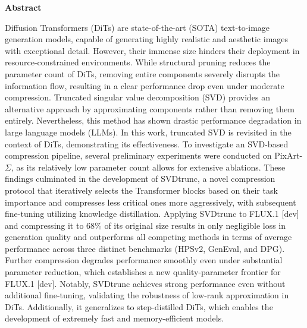 \thispagestyle{plain}
\setcounter{page}{3}
\begin{center}
    \textbf{Abstract}\\
\end{center}
    Diffusion Transformers (\gls{DiT}s) are state-of-the-art (\gls{SOTA}) text-to-image generation models, capable of generating highly realistic and aesthetic images with exceptional detail. However, their immense size hinders their deployment in resource-constrained environments. While structural pruning reduces the parameter count of \gls{DiT}s, removing entire components severely disrupts the information flow, resulting in a clear performance drop even under moderate compression. Truncated singular value decomposition (\gls{SVD}) provides an alternative approach by approximating components rather than removing them entirely. Nevertheless, this method has shown drastic performance degradation in large language models (\gls{LLM}s). In this work, truncated \gls{SVD} is revisited in the context of \gls{DiT}s, demonstrating its effectiveness. To investigate an \gls{SVD}-based compression pipeline, several preliminary experiments were conducted on PixArt-$\Sigma$, as its relatively low parameter count allows for extensive ablations. These findings culminated in the development of \gls{SVD}trunc, a novel compression protocol that iteratively selects the Transformer blocks based on their task importance and compresses less critical ones more aggressively, with subsequent fine-tuning utilizing knowledge distillation. Applying \gls{SVD}trunc to FLUX.1 [dev] and compressing it to 68\% of its original size results in only negligible loss in generation quality and outperforms all competing methods in terms of average performance across three distinct benchmarks (HPSv2, GenEval, and DPG). Further compression degrades performance smoothly even under substantial parameter reduction, which establishes a new quality-parameter frontier for FLUX.1 [dev]. Notably, \gls{SVD}trunc achieves strong performance even without additional fine-tuning, validating the robustness of low-rank approximation in \gls{DiT}s. Additionally, it generalizes to step-distilled \gls{DiT}s, which enables the development of extremely fast and memory-efficient models.
    

